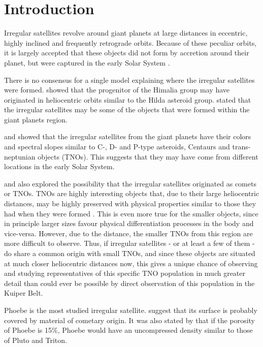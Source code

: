 \documentclass[useAMS,usenatbib]{mn2e}
\begin{document}
\section{Introduction}\label{Sec: introducao}

Irregular satellites revolve around giant planets at large distances in eccentric, highly inclined and frequently retrograde orbits. Because of these peculiar orbits, it is largely accepted that these objects did not form by accretion around their planet, but were captured in the early Solar System \citep{Sheppard2005}.

There is no consensus for a single model explaining where the irregular satellites were formed. \cite{Cuk2004} showed that the progenitor of the Himalia group may have originated in heliocentric orbits similar to the Hilda asteroid group. \cite{Sheppard2005} stated that the irregular satellites may be some of the objects that were formed within the giant planets region.

\cite{Grav2003} and \cite{Grav2007} showed that the irregular satellites from the giant planets have their colors and spectral slopes similar to C-, D- and P-type asteroids, Centaurs and trans-neptunian objects (TNOs). This suggests that they may have come from different locations in the early Solar System.

\cite{Sheppard2005} and \cite{Jewitt2007} also explored the possibility that the irregular satellites originated as comets or TNOs. TNOs are highly interesting objects that, due to their large heliocentric distances, may be highly preserved with physical properties similar to those they had when they were formed \citep{Barucci2008}. This is even more true for the smaller objects, since in principle larger sizes favour physical differentiation processes in the body and vice-versa. However, due to the distance, the smaller TNOs from this region are more difficult to observe. Thus, if irregular satellites - or at least a few of them - do share a common origin with small TNOs, and since these objects are situated at much closer heliocentric distances now, this gives a unique chance of observing and studying representatives of this specific TNO population in much greater detail than could ever be possible by direct observation of this population in the Kuiper Belt. 

Phoebe is the most studied irregular satellite. \cite{Clark2005} suggest that its surface is probably covered by material of cometary origin. It was also stated by \cite{Johnson2005} that if the porosity of Phoebe is 15\%, Phoebe would have an uncompressed density similar to those of Pluto and Triton.
\end{document}
